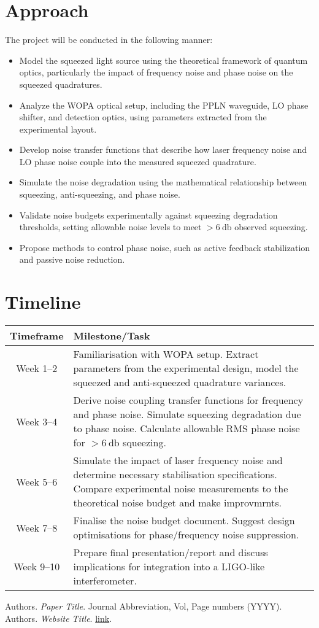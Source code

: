 \documentclass[colorlinks=true,pdfstartview=FitV,linkcolor=blue,
citecolor=red,urlcolor=magenta]{ligodoc}
\begin{document}
\section{Approach}
The project will be conducted in the following manner:

\begin{itemize}
    \item Model the squeezed light source using the theoretical framework of quantum optics, particularly the impact of frequency noise and phase noise on the squeezed quadratures.
    \item Analyze the WOPA optical setup, including the PPLN waveguide, LO phase shifter, and detection optics, using parameters extracted from the experimental layout.
    \item Develop noise transfer functions that describe how laser frequency noise and LO phase noise couple into the measured squeezed quadrature.
    \item Simulate the noise degradation using the mathematical relationship between squeezing, anti-squeezing, and phase noise.
    \item Validate noise budgets experimentally against squeezing degradation thresholds, setting allowable noise levels to meet $>\SI{6}{\decibel}$ observed squeezing.
    \item Propose methods to control phase noise, such as active feedback stabilization and passive noise reduction.
\end{itemize}

\section{Timeline}
\begin{longtable}{|c|p{11cm}|}
\hline
\textbf{Timeframe} & \textbf{Milestone/Task} \\
\hline
Week 1--2 & Familiarisation with WOPA setup. Extract parameters from the experimental design, model the squeezed and anti-squeezed quadrature variances. \\
\hline
Week 3--4 & Derive noise coupling transfer functions for frequency and phase noise. Simulate squeezing degradation due to phase noise. Calculate allowable RMS phase noise for $>\SI{6}{\decibel}$ squeezing.  \\
\hline
Week 5--6 &  Simulate the impact of laser frequency noise and determine necessary stabilisation specifications. Compare experimental noise measurements to the theoretical noise budget and make improvmrnts.\\
\hline
Week 7--8 &  Finalise the noise budget document. Suggest design optimisations for phase/frequency noise suppression.\\
\hline
Week 9--10 &  Prepare final presentation/report and discuss implications for integration into a LIGO-like interferometer.   \\
\hline
\end{longtable}


\begin{thebibliography}{9}
 Authors. \emph{Paper Title}. Journal Abbreviation, Vol, Page numbers (YYYY).
 Authors. \emph{Website Title}. \url{link}.

\end{thebibliography}
\end{document}
